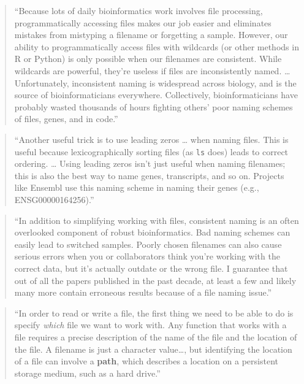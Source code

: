 \documentclass[]{tufte-book}
\begin{document}
\begin{quote}
``Because lots of daily bioinformatics work involves file processing, programmatically
accessing files makes our job easier and eliminates mistakes from mistyping a filename
or forgetting a sample. However, our ability to programmatically access files with
wildcards (or other methods in R or Python) is only possible when our filenames are
consistent. While wildcards are powerful, they're useless if files are inconsistently
named. \ldots{} Unfortunately, inconsistent naming is widespread across biology, and is
the source of bioinformaticians everywhere. Collectively, bioinformaticians have
probably wasted thousands of hours fighting others' poor naming schemes of files,
genes, and in code.'' \citep{buffalo2015bioinformatics}
\end{quote}

\begin{quote}
``Another useful trick is to use leading zeros \ldots{} when naming files. This is useful
because lexicographically sorting files (as \texttt{ls} does) leads to correct ordering. \ldots{}
Using leading zeros isn't just useful when naming filenames; this is also the best
way to name genes, transcripts, and so on. Projects like Ensembl use this naming
scheme in naming their genes (e.g., ENSG00000164256).'' \citep{buffalo2015bioinformatics}
\end{quote}

\begin{quote}
``In addition to simplifying working with files, consistent naming is an often overlooked
component of robust bioinformatics. Bad naming schemes can easily lead to switched samples.
Poorly chosen filenames can also cause serious errors when you or collaborators think you're
working with the correct data, but it's actually outdate or the wrong file. I guarantee
that out of all the papers published in the past decade, at least a few and likely many
more contain erroneous results because of a file naming issue.'' \citep{buffalo2015bioinformatics}
\end{quote}

\begin{quote}
``In order to read or write a file, the first thing we need to be able to do is specify
\emph{which} file we want to work with. Any function that works with a file requires a
precise description of the name of the file and the location of the file. A filename
is just a character value\ldots, but identifying the location of a file can involve a
\textbf{path}, which describes a location on a persistent storage medium, such as a hard drive.''
\citep{murrell2009introduction}
\end{quote}
\end{document}
